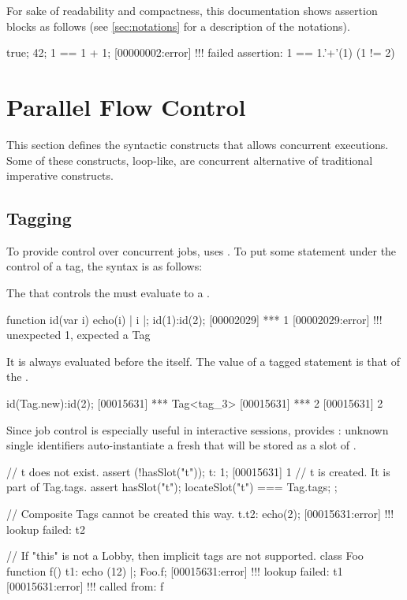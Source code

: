 For sake of readability and compactness, this documentation shows assertion
blocks as follows (see \autoref{sec:notations} for a description of the
notations).

\begin{urbiassert}
true;
42;
1 == 1 + 1;
[00000002:error] !!! failed assertion: 1 == 1.'+'(1) (1 != 2)
\end{urbiassert}


\section{Parallel Flow Control}

This section defines the syntactic constructs that allows concurrent
executions.  Some of these constructs, loop-like, are concurrent alternative
of traditional imperative constructs.

\subsection{Tagging}
\label{sec:lang:tag}
To provide control over concurrent jobs, \us uses .  To
put some statement under the control of a tag, the syntax is as follows:


The  that controls the  must evaluate to a
.

\begin{urbiscript}
function id(var i) { echo(i) | i }|;
id(1):id(2);
[00002029] *** 1
[00002029:error] !!! unexpected 1, expected a Tag
\end{urbiscript}

It is always evaluated before the  itself.  The value of a
tagged statement is that of the .
\begin{urbiscript}
id(Tag.new):id(2);
[00015631] *** Tag<tag_3>
[00015631] *** 2
[00015631] 2
\end{urbiscript}

Since job control is especially useful in interactive sessions, \us provides
: unknown single identifiers auto-instantiate a fresh
 that will be stored as a slot of .

\begin{urbiscript}
// t does not exist.
assert (!hasSlot("t"));
t: 1;
[00015631] 1
// t is created.  It is part of Tag.tags.
assert
{
  hasSlot("t");
  locateSlot("t") === Tag.tags;
};

// Composite Tags cannot be created this way.
t.t2: echo(2);
[00015631:error] !!! lookup failed: t2

// If "this" is not a Lobby, then implicit tags are not supported.
class Foo { function f() { t1: echo (12) } }|;
Foo.f;
[00015631:error] !!! lookup failed: t1
[00015631:error] !!!    called from: f
\end{urbiscript}


